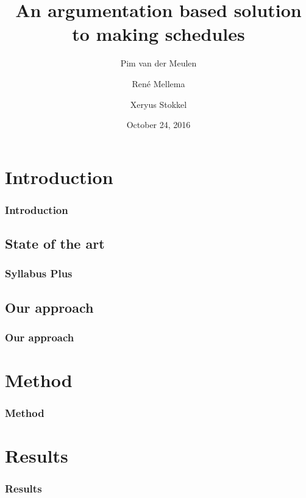 \documentclass{beamer}
\title{An argumentation based solution to making schedules}
\author{Pim van der Meulen \and Ren\'e Mellema \and Xeryus Stokkel}
\date{October 24, 2016}
\begin{document}
\frame{\titlepage}

\section{Introduction}
\begin{frame}
	\frametitle{Introduction}
\end{frame}

\subsection{State of the art}
\begin{frame}
	\frametitle{Syllabus Plus}
\end{frame}

\subsection{Our approach}
\begin{frame}
	\frametitle{Our approach}
\end{frame}

\section{Method}
\begin{frame}
	\frametitle{Method}
\end{frame}

\section{Results}
\begin{frame}
	\frametitle{Results}
\end{frame}

\end{document}
